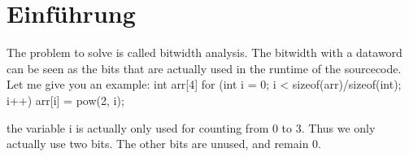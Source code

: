 \chapter{Einführung}\label{sec:intro}


The problem to solve is called bitwidth analysis.
The bitwidth with a dataword can be seen as the bits that are actually used in the runtime of the sourcecode.
Let me give you an example:
int arr[4]
for (int i = 0; i < sizeof(arr)/sizeof(int); i++)
{
   arr[i] = pow(2, i);
}

the variable i is actually only used for counting from 0 to 3.
Thus we only actually use two bits. The other bits are unused, and remain 0.


